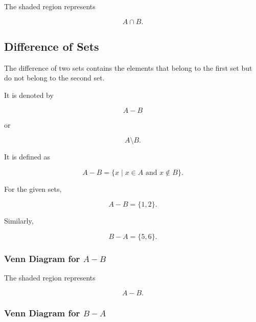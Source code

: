 \documentclass[12pt,a4paper]{article}
\begin{document}
The shaded region represents

\[
A\cap B.
\]


\subsection{Difference of Sets}

The difference of two sets contains the elements that belong to the first
set but do not belong to the second set.

It is denoted by

\[
A-B
\]

or

\[
A\setminus B.
\]

It is defined as

\[
A-B
=
\{x\mid x\in A\text{ and }x\notin B\}.
\]

For the given sets,

\[
A-B=\{1,2\}.
\]

Similarly,

\[
B-A=\{5,6\}.
\]

\subsubsection*{Venn Diagram for $A-B$}

\begin{center}
\end{center}

The shaded region represents

\[
A-B.
\]

\subsubsection*{Venn Diagram for $B-A$}
\end{document}
